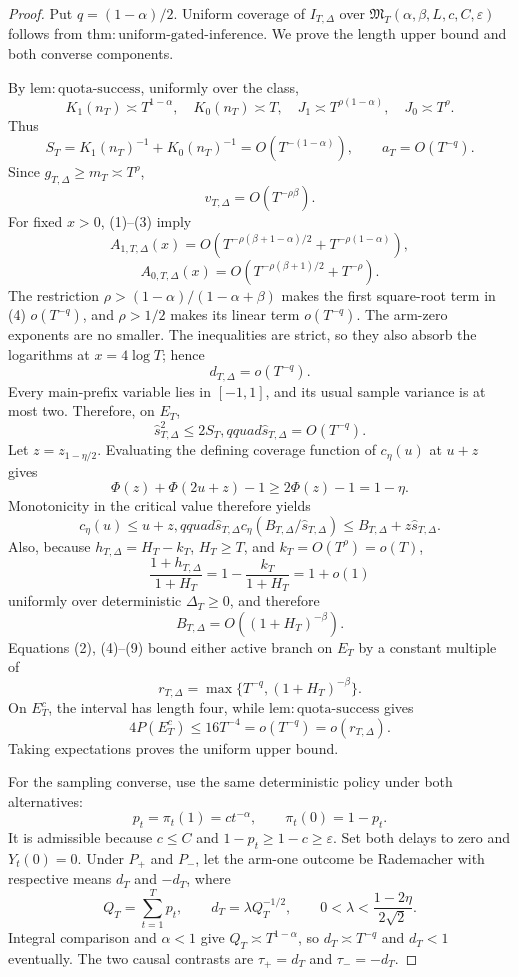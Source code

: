 \documentclass{article}
\begin{document}
\begin{proof}
Put \(q=(1-\alpha)/2\).  Uniform coverage of \(I_{T,\Delta}\) over \(\mathfrak M_T(\alpha,\beta,L,c,C,\varepsilon)\) follows from \(\mathrm{thm:uniform\text{-}gated\text{-}inference}\).  We prove the length upper bound and both converse components.

By \(\mathrm{lem:quota\text{-}success}\), uniformly over the class,
\[
 K_1(n_T)\asymp T^{1-\alpha},\quad K_0(n_T)\asymp T,
 \quad J_1\asymp T^{\rho(1-\alpha)},\quad J_0\asymp T^\rho. \tag{1}
\]
Thus
\[
 S_T=K_1(n_T)^{-1}+K_0(n_T)^{-1}=O(T^{-(1-\alpha)}),
 \qquad a_T=O(T^{-q}). \tag{2}
\]
Since \(g_{T,\Delta}\geq m_T\asymp T^\rho\),
\[
 v_{T,\Delta}=O(T^{-\rho\beta}). \tag{3}
\]
For fixed \(x>0\), (1)--(3) imply
\[
 A_{1,T,\Delta}(x)=O\!\left(T^{-\rho(\beta+1-\alpha)/2}
 +T^{-\rho(1-\alpha)}\right), \tag{4}
\]
\[
 A_{0,T,\Delta}(x)=O\!\left(T^{-\rho(\beta+1)/2}+T^{-\rho}\right). \tag{5}
\]
The restriction \(\rho>(1-\alpha)/(1-\alpha+\beta)\) makes the first square-root term in (4) \(o(T^{-q})\), and \(\rho>1/2\) makes its linear term \(o(T^{-q})\).  The arm-zero exponents are no smaller.  The inequalities are strict, so they also absorb the logarithms at \(x=4\log T\); hence
\[
 d_{T,\Delta}=o(T^{-q}). \tag{6}
\]
Every main-prefix variable lies in \([-1,1]\), and its usual sample variance is at most two.  Therefore, on \(E_T\),
\[
 \widehat s_{T,\Delta}^2\leq2S_T,qquad
 \widehat s_{T,\Delta}=O(T^{-q}). \tag{7}
\]
Let \(z=z_{1-\eta/2}\).  Evaluating the defining coverage function of \(c_\eta(u)\) at \(u+z\) gives
\[
 \Phi(z)+\Phi(2u+z)-1\geq2\Phi(z)-1=1-\eta.
\]
Monotonicity in the critical value therefore yields
\[
 c_\eta(u)\leq u+z,qquad
 \widehat s_{T,\Delta}c_\eta(B_{T,\Delta}/\widehat s_{T,\Delta})
 \leq B_{T,\Delta}+z\widehat s_{T,\Delta}. \tag{8}
\]
Also, because \(h_{T,\Delta}=H_T-k_T\), \(H_T\geq T\), and \(k_T=O(T^\rho)=o(T)\),
\[
 \frac{1+h_{T,\Delta}}{1+H_T}=1-\frac{k_T}{1+H_T}=1+o(1)
\]
uniformly over deterministic \(\Delta_T\geq0\), and therefore
\[
 B_{T,\Delta}=O((1+H_T)^{-\beta}). \tag{9}
\]
Equations (2), (4)--(9) bound either active branch on \(E_T\) by a constant multiple of
\[
 r_{T,\Delta}=\max\{T^{-q},(1+H_T)^{-\beta}\}. \tag{10}
\]
On \(E_T^c\), the interval has length four, while \(\mathrm{lem:quota\text{-}success}\) gives
\[
 4P(E_T^c)\leq16T^{-4}=o(T^{-q})=o(r_{T,\Delta}). \tag{11}
\]
Taking expectations proves the uniform upper bound.

For the sampling converse, use the same deterministic policy under both alternatives:
\[
 p_t=\pi_t(1)=ct^{-\alpha},\qquad \pi_t(0)=1-p_t. \tag{12}
\]
It is admissible because \(c\leq C\) and \(1-p_t\geq1-c\geq\varepsilon\).  Set both delays to zero and \(Y_t(0)=0\).  Under \(P_+\) and \(P_-\), let the arm-one outcome be Rademacher with respective means \(d_T\) and \(-d_T\), where
\[
 Q_T=\sum_{t=1}^Tp_t,\qquad d_T=\lambda Q_T^{-1/2},
 \qquad 0<\lambda<\frac{1-2\eta}{2\sqrt2}. \tag{13}
\]
Integral comparison and \(\alpha<1\) give \(Q_T\asymp T^{1-\alpha}\), so \(d_T\asymp T^{-q}\) and \(d_T<1\) eventually.  The two causal contrasts are \(\tau_+=d_T\) and \(\tau_-=-d_T\).


\end{proof}
\end{document}
